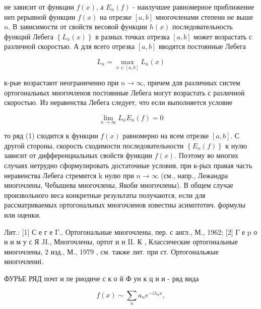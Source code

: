 \documentclass[10pt]{article}
\begin{document}
не зависит от функции $f(x)$, а $E_{n}(f)$ - наилучшее равномерное приближение неп рерывной функции $f(x)$ на отрезке $[a, b]$ многочленами степени не выше $n$. В зависимости от свойств весовой функции $h(x)$ последовательность функций Лебега $\left\{L_{n}(x)\right\}$ в разных точках отрезка $[a, b]$ может возрастать с различной скоростью. А для всего отрезка $[a, b]$ вводятся постоянные Лебега



\[

L_{n}=\max _{x \in[a, b]} L_{n}(x)

\]



к-рые возрастают неограниченно при $n \rightarrow \infty$, причем для различных систем ортогональных многочленов постоянные Лебега могут возрастать с различноӥ скоростью. Из неравенства Лебега следует, что если выполняется условие



\[

\lim _{n \rightarrow \infty} L_{n} E_{n}(f)=0

\]



то ряд (1) сходится к функции $f(x)$ равномерно на всем отрезке $[a, b]$. С другой стороны, скорость сходимости последовательности $\left\{E_{n}(f)\right\}$ к нулю зависит от дифференциальных свойств функции $f(x)$. Поэтому во многих случаях нетрудно сформулировать достаточные условия, при к-рых правая часть неравенства Лебега стремится $\mathrm{k}$ нулю при $n \rightarrow \infty$ (см., напр., Лежандра многочлены, Чебышева многочлены, Якоби многочлены). В общем случае произвольного веса конкретные результаты получаются, если для рассматриваемых ортогональных многочленов известны асимптотич. формулы или оценки.



Лит.: [1] С е г е Г., Ортогональные многочлены, пер. с англ., М., 1962; [2] Г е p о н и м у с Я JI., Многочлены, ортот и н II. К , Классические ортогональные многочлены, 2 изд., М., 1979 , см. также лит. при ст. Ортогональжые многочлениі.



ФУРЬЕ РЯД почт и пе риодиче с к о й Ф ун к ц и и - ряд вида



\[

f(x) \sim \sum_{n} a_{n} e^{-i \lambda_{n} x},

\]
\end{document}

